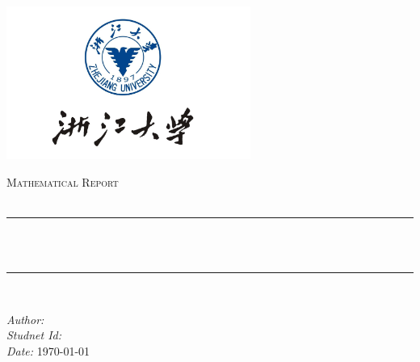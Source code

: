 \begin{titlepage}

    \newcommand{\HRule}{\rule{\linewidth}{0.5mm}}
    
    \centering
    \includegraphics[width=8cm]{title/logo.png}\\[1cm] 
     
    \begin{center}
    \textsc{\LARGE Mathematical Report}\\[2.0cm] 
    \textsc{\Large \CourseName{}}\\[0.5cm] 
    \end{center}

    \makeatletter
    \HRule \\[0.4cm]
    { \huge \bfseries \Title}\\[0.4cm] 
    \HRule \\[2.5cm]
    
    \begin{center}
    \emph{Author:} \@author\\[0.2cm] 
    \emph{Studnet Id:} \StudentId{}\\[0.2cm]
    \emph{Date:} \today\\[2cm] 
    \end{center}

    \vfill 
\end{titlepage}